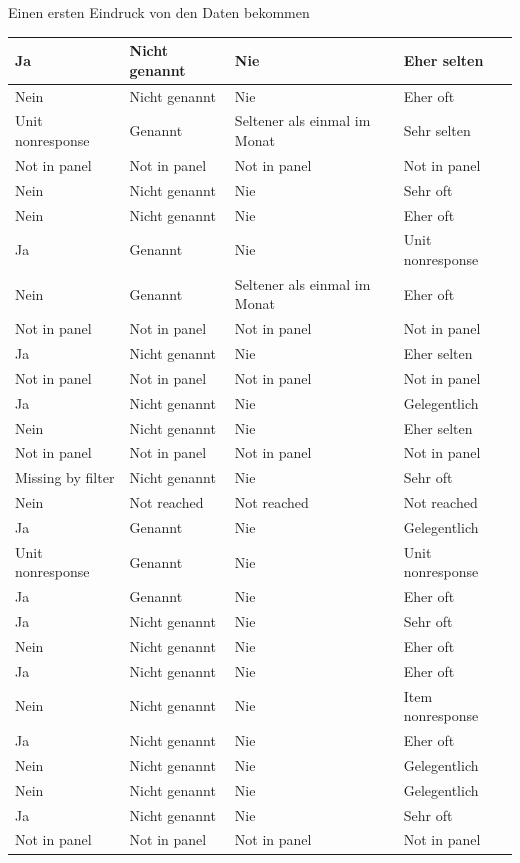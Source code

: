 \documentclass[ignorenonframetext,]{beamer}
\begin{document}
\begin{frame}{Einen ersten Eindruck von den Daten bekommen}
\begin{tabular}{l|l|l|l}
\hline
Ja & Nicht genannt & Nie & Eher selten\\
\hline
Nein & Nicht genannt & Nie & Eher oft\\
\hline
Unit nonresponse & Genannt & Seltener als einmal im Monat & Sehr selten\\
\hline
Not in panel & Not in panel & Not in panel & Not in panel\\
\hline
Nein & Nicht genannt & Nie & Sehr oft\\
\hline
Nein & Nicht genannt & Nie & Eher oft\\
\hline
Ja & Genannt & Nie & Unit nonresponse\\
\hline
Nein & Genannt & Seltener als einmal im Monat & Eher oft\\
\hline
Not in panel & Not in panel & Not in panel & Not in panel\\
\hline
Ja & Nicht genannt & Nie & Eher selten\\
\hline
Not in panel & Not in panel & Not in panel & Not in panel\\
\hline
Ja & Nicht genannt & Nie & Gelegentlich\\
\hline
Nein & Nicht genannt & Nie & Eher selten\\
\hline
Not in panel & Not in panel & Not in panel & Not in panel\\
\hline
Missing by filter & Nicht genannt & Nie & Sehr oft\\
\hline
Nein & Not reached & Not reached & Not reached\\
\hline
Ja & Genannt & Nie & Gelegentlich\\
\hline
Unit nonresponse & Genannt & Nie & Unit nonresponse\\
\hline
Ja & Genannt & Nie & Eher oft\\
\hline
Ja & Nicht genannt & Nie & Sehr oft\\
\hline
Nein & Nicht genannt & Nie & Eher oft\\
\hline
Ja & Nicht genannt & Nie & Eher oft\\
\hline
Nein & Nicht genannt & Nie & Item nonresponse\\
\hline
Ja & Nicht genannt & Nie & Eher oft\\
\hline
Nein & Nicht genannt & Nie & Gelegentlich\\
\hline
Nein & Nicht genannt & Nie & Gelegentlich\\
\hline
Ja & Nicht genannt & Nie & Sehr oft\\
\hline
Not in panel & Not in panel & Not in panel & Not in panel\\

\end{tabular}
\end{frame}
\end{document}
